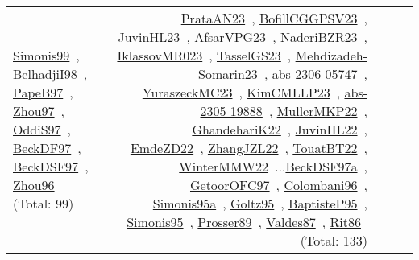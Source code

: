 {\begin{longtable}{p{3cm}r>{\raggedright\arraybackslash}p{6cm}>{\raggedright\arraybackslash}p{6cm}>{\raggedright\arraybackslash}p{8cm}}
\href{../works/Simonis99.pdf}{Simonis99}~\cite{Simonis99}, \href{../works/BelhadjiI98.pdf}{BelhadjiI98}~\cite{BelhadjiI98}, \href{../works/PapeB97.pdf}{PapeB97}~\cite{PapeB97}, \href{../works/Zhou97.pdf}{Zhou97}~\cite{Zhou97}, \href{../works/OddiS97.pdf}{OddiS97}~\cite{OddiS97}, \href{../works/BeckDF97.pdf}{BeckDF97}~\cite{BeckDF97}, \href{../works/BeckDSF97.pdf}{BeckDSF97}~\cite{BeckDSF97}, \href{../works/Zhou96.pdf}{Zhou96}~\cite{Zhou96} (Total: 99) & \href{../works/PrataAN23.pdf}{PrataAN23}~\cite{PrataAN23}, \href{../works/BofillCGGPSV23.pdf}{BofillCGGPSV23}~\cite{BofillCGGPSV23}, \href{../works/JuvinHL23.pdf}{JuvinHL23}~\cite{JuvinHL23}, \href{../works/AfsarVPG23.pdf}{AfsarVPG23}~\cite{AfsarVPG23}, \href{../works/NaderiBZR23.pdf}{NaderiBZR23}~\cite{NaderiBZR23}, \href{../works/IklassovMR023.pdf}{IklassovMR023}~\cite{IklassovMR023}, \href{../works/TasselGS23.pdf}{TasselGS23}~\cite{TasselGS23}, \href{../works/Mehdizadeh-Somarin23.pdf}{Mehdizadeh-Somarin23}~\cite{Mehdizadeh-Somarin23}, \href{../works/abs-2306-05747.pdf}{abs-2306-05747}~\cite{abs-2306-05747}, \href{../works/YuraszeckMC23.pdf}{YuraszeckMC23}~\cite{YuraszeckMC23}, \href{../works/KimCMLLP23.pdf}{KimCMLLP23}~\cite{KimCMLLP23}, \href{../works/abs-2305-19888.pdf}{abs-2305-19888}~\cite{abs-2305-19888}, \href{../works/MullerMKP22.pdf}{MullerMKP22}~\cite{MullerMKP22}, \href{../works/GhandehariK22.pdf}{GhandehariK22}~\cite{GhandehariK22}, \href{../works/JuvinHL22.pdf}{JuvinHL22}~\cite{JuvinHL22}, \href{../works/EmdeZD22.pdf}{EmdeZD22}~\cite{EmdeZD22}, \href{../works/ZhangJZL22.pdf}{ZhangJZL22}~\cite{ZhangJZL22}, \href{../works/TouatBT22.pdf}{TouatBT22}~\cite{TouatBT22}, \href{../works/WinterMMW22.pdf}{WinterMMW22}~\cite{WinterMMW22}...\href{../works/BeckDSF97a.pdf}{BeckDSF97a}~\cite{BeckDSF97a}, \href{../works/GetoorOFC97.pdf}{GetoorOFC97}~\cite{GetoorOFC97}, \href{../works/Colombani96.pdf}{Colombani96}~\cite{Colombani96}, \href{../works/Simonis95a.pdf}{Simonis95a}~\cite{Simonis95a}, \href{../works/Goltz95.pdf}{Goltz95}~\cite{Goltz95}, \href{../works/BaptisteP95.pdf}{BaptisteP95}~\cite{BaptisteP95}, \href{../works/Simonis95.pdf}{Simonis95}~\cite{Simonis95}, \href{../works/Prosser89.pdf}{Prosser89}~\cite{Prosser89}, \href{../works/Valdes87.pdf}{Valdes87}~\cite{Valdes87}, \href{../works/Rit86.pdf}{Rit86}~\cite{Rit86} (Total: 133)\\

\end{longtable}}
